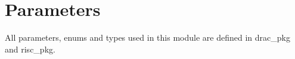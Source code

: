 \section{Parameters}
\label{chapter3}

All parameters, enums and types used in this module are defined in drac\_pkg and risc\_pkg.